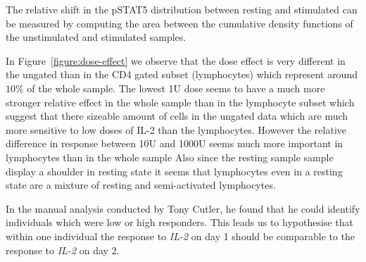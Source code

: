 The relative shift in the pSTAT5 distribution between resting and stimulated can be measured by computing the area between the cumulative density functions of the unstimulated and stimulated samples.

In Figure~\ref{figure:dose-effect} we observe that the dose effect is very different in the ungated than in the CD4 gated subset (lymphocytes) which represent around $10\%$ of
the whole sample.
The lowest 1U dose seems to have a much more stronger relative effect in the whole sample than in the lymphocyte subset which suggest that there sizeable amount of cells in the ungated
data which are much more sensitive to low doses of IL-2 than the lymphocytes.
However the relative difference in response between 10U and 1000U seems much more important in lymphocytes than in the whole sample
Also since the resting sample sample display a shoulder in resting state it seems that lymphocytes even in a resting state are a mixture of resting and semi-activated lymphocytes.


In the manual analysis conducted by Tony Cutler, he found that he could identify individuals which were low or high responders.
This leads us to hypothesise that within one individual the response to \emph{IL-2} on day 1 should be comparable to the response to \emph{IL-2} on day 2.



